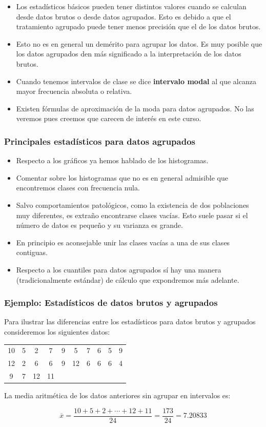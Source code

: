 \begin{frame}
\begin{itemize}
\item Los estadísticos básicos pueden tener distintos valores cuando se calculan desde datos brutos o desde datos agrupados. Esto es debido a que  el tratamiento agrupado puede tener menos precisión que el de los datos brutos.
\item Esto no es en general un demérito para agrupar los datos. Es muy posible que los datos  agrupados  den más significado a la interpretación de los datos brutos.
\item Cuando tenemos intervalos de clase se dice \textbf{intervalo modal} al que alcanza mayor frecuencia absoluta o relativa.
\item Existen fórmulas de aproximación de la moda  para datos agrupados. No las veremos pues creemos que  carecen de interés en este curso.
\end{itemize}
\end{frame}

\begin{frame}
\frametitle{Principales estadísticos para datos agrupados}
\begin{itemize}
\item  Respecto a los gráficos ya hemos hablado de los histogramas.
\item  Comentar sobre los histogramas que no es en general admisible que  encontremos clases con frecuencia nula.
\item  Salvo comportamientos patológicos, como la existencia de dos poblaciones muy diferentes, es extraño encontrarse clases vacías. Esto suele pasar si el número de datos es pequeño y su varianza es grande.
\item En principio es aconsejable unir las clases vacías a una de sus clases contiguas.
\item Respecto a los cuantiles para datos agrupados sí hay una manera (tradicionalmente estándar)  de cálculo que expondremos más adelante.
\end{itemize}
\end{frame}



\begin{frame}
\frametitle{Ejemplo: Estadísticos de datos brutos y agrupados}
Para ilustrar las diferencias entre los estadísticos para datos brutos y agrupados
consideremos los siguientes datos:
\begin{center}
\begin{tabular}{cccccccccc}
10 & 5 & 2 & 7 & 9 & 5 & 7 & 6 & 5 & 9 \\ 12 & 2 & 6 & 6 & 9 & 12 & 6 & 6 & 6 & 4 \\
 9 & 7 & 12 & 11 & & & & & &
\end{tabular}
\end{center}

 La media aritmética de los datos anteriores sin agrupar en intervalos es:

$$\overline{x}= \frac{10+5+2+\cdots +12+11}{24}=\frac{173}{24}=7.20833$$
\end{frame}

